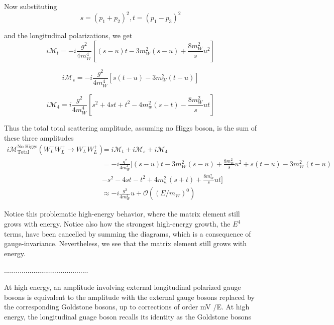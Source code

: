 \documentclass[11pt]{article}
\begin{document}
{Now substituting 
\begin{equation}
    s=\left(p_{1}+p_{2}\right)^{2}, t=\left(p_{1}-p_{3}\right)^{2}
\end{equation}

and the longitudinal polarizations, we get
\begin{equation}
    i \mathcal{M}_{t}=-i \frac{g^{2}}{4 m_{W}^{4}}\left[(s-u) t-3 m_{W}^{2}(s-u)+\frac{8 m_{W}^{2}}{s} u^{2}\right]
\end{equation}

\begin{equation}
    i \mathcal{M}_{s}=-i \frac{g^{2}}{4 m_{W}^{4}}\left[s(t-u)-3 m_{W}^{2}(t-u)\right]
\end{equation}

\begin{equation}
    i \mathcal{M}_{4}=i \frac{g^{2}}{4 m_{W}^{4}}\left[s^{2}+4 s t+t^{2}-4 m_{w}^{2}(s+t)-\frac{8 m_{W}^{2}}{s} u t\right]
\end{equation}

Thus the total total scattering amplitude, assuming no Higgs boson, is the sum of these three amplitudes
\begin{equation}
\begin{aligned}
    i \mathcal{M}_{\text{Total}}^{\text{No Higgs}}(W_{L}^{-} W_{L}^{+} \rightarrow W_{L}^{-} W_{L}^{+}) &= i \mathcal{M}_{t} +i \mathcal{M}_{s} + i \mathcal{M}_{4} \\
    &= -i \frac{g^{2}}{4 m_{W}^{4}} [ (s-u) t-3 m_{W}^{2}(s-u)+\frac{8 m_{W}^{2}}{s} u^{2} + s(t-u)-3 m_{W}^{2}(t-u)\\ & - s^{2} - 4 s t-t^{2}+4 m_{w}^{2}(s+t)+ \frac{8 m_{W}^{2}}{s} u t ] \\
    & \approx -i \frac{g^{2}}{4 m_{W}^{2}} u+\mathcal{O}\left(\left(E / m_{W}\right)^{0}\right)
\end{aligned}
\end{equation}

Notice this problematic high-energy behavior, where the matrix element still grows with energy. Notice also how the strongest high-energy growth, the $E^4$ terms, have been cancelled by summing the diagrams, which is a consequence of gauge-invariance. Nevertheless, we see that the matrix element still grows with energy.


...........................................

 At high energy, an amplitude involving external
longitudinal polarized gauge bosons is equivalent to the amplitude with
the external gauge bosons replaced by the corresponding Goldstone
bosons, up to corrections of order mV /E. At high energy, the
longitudinal guage boson recalls its identity as the Goldstone bosons

}
\end{document}
